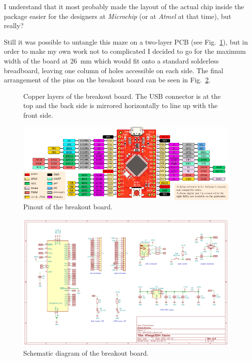 \begin{multicols}{2}
I understand that it most probably made the layout of the actual chip inside the package easier
for the designers at \emph{Microchip} (or at \emph{Atmel} at that time), but really?

Still it was possible to untangle this maze on a two-layer PCB (see Fig.~\ref{fig.m32u4_board}), but in order to make my own work
not to complicated I decided to go for the maximum width of the board at \SI{26}{\milli\metre} which would fit onto a
standard solderless breadboard, leaving one column of holes accessible on each side. The final arrangement of the pins on the
breakout board can be seen in Fig.~\ref{fig.m32u4_pinout}.

\begin{figure}[H]
  \centering
  \caption{Copper layers of the breakout board. The USB connector is at the top and the back side is mirrored horizontally to line up with the front side.}\label{fig.m32u4_board}
\end{figure}

\begin{figure}
  \centering
  \includegraphics[width=\textwidth]{20210211_eduino_pinout}
  \caption{Pinout of the breakout board.}\label{fig.m32u4_pinout}
\end{figure}

\begin{figure}
  \centering
  \includegraphics[width=\textwidth]{20210211_eduino}
  \caption{Schematic diagram of the breakout board.}\label{fig.m32u4_sch}
\end{figure}


\end{multicols}
